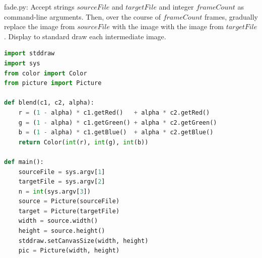 \documentclass[8pt,a4paper,compress,handout]{beamer}
\begin{document}
\begin{frame}[fragile]
\begin{framed}
\tiny fade.py: Accept strings $sourceFile$ and $targetFile$ and integer $frameCount$ as command-line arguments. Then, over the course of $frameCount$ frames, gradually replace the image from $sourceFile$ with the image with the image from $targetFile$. Display to standard draw each intermediate image. 
\end{framed}

\begin{lstlisting}[language=Python]
import stddraw
import sys
from color import Color
from picture import Picture

def blend(c1, c2, alpha):
    r = (1 - alpha) * c1.getRed()   + alpha * c2.getRed()
    g = (1 - alpha) * c1.getGreen() + alpha * c2.getGreen()
    b = (1 - alpha) * c1.getBlue()  + alpha * c2.getBlue()
    return Color(int(r), int(g), int(b))

def main():
    sourceFile = sys.argv[1]
    targetFile = sys.argv[2]
    n = int(sys.argv[3])
    source = Picture(sourceFile)
    target = Picture(targetFile)
    width = source.width()
    height = source.height()
    stddraw.setCanvasSize(width, height)
    pic = Picture(width, height)
\end{lstlisting}
\end{frame}
\end{document}
